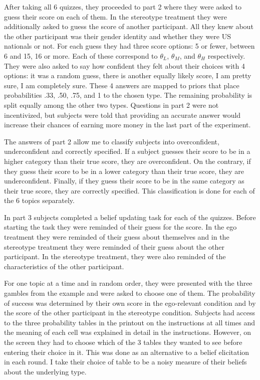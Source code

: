 \documentclass[
  12pt,
]{article}
\begin{document}
After taking all 6 quizzes, they proceeded to part 2 where they were
asked to guess their score on each of them. In the stereotype treatment
they were additionally asked to guess the score of another participant.
All they knew about the other participant was their gender identity and
whether they were US nationals or not. For each guess they had three
score options: 5 or fewer, between 6 and 15, 16 or more. Each of these
correspond to \(\theta_L\), \(\theta_M\), and \(\theta_H\) respectively.
They were also asked to say how confident they felt about their choices
with 4 options: it was a random guess, there is another equally likely
score, I am pretty sure, I am completely sure. These 4 answers are
mapped to priors that place probabilities .33, .50, .75, and 1 to the
chosen type. The remaining probability is split equally among the other
two types. Questions in part 2 were not incentivized, but subjects were
told that providing an accurate answer would increase their chances of
earning more money in the last part of the experiment.

The answers of part 2 allow me to classify subjects into overconfident,
underconfident and correctly specified. If a subject guesses their score
to be in a higher category than their true score, they are
overconfident. On the contrary, if they guess their score to be in a
lower category than their true score, they are underconfident. Finally,
if they guess their score to be in the same category as their true
score, they are correctly specified. This classification is done for
each of the 6 topics separately.

In part 3 subjects completed a belief updating task for each of the
quizzes. Before starting the task they were reminded of their guess for
the score. In the ego treatment they were reminded of their guess about
themselves and in the stereotype treatment they were reminded of their
guess about the other participant. In the stereotype treatment, they
were also reminded of the characteristics of the other participant.

For one topic at a time and in random order, they were presented with
the three gambles from the example and were asked to choose one of them.
The probability of success was determined by their own score in the
ego-relevant condition and by the score of the other participant in the
stereotype condition. Subjects had access to the three probability
tables in the printout on the instructions at all times and the meaning
of each cell was explained in detail in the instructions. However, on
the screen they had to choose which of the 3 tables they wanted to see
before entering their choice in it. This was done as an alternative to a
belief elicitation in each round. I take their choice of table to be a
noisy measure of their beliefs about the underlying type.
\end{document}
